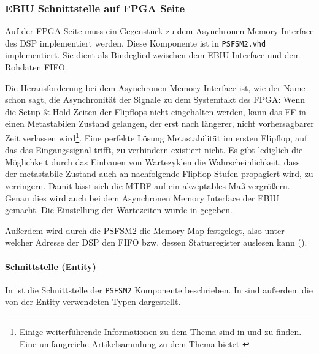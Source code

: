 \subsubsection{EBIU Schnittstelle auf FPGA Seite}


Auf der FPGA Seite muss ein Gegenstück zu dem Asynchronen Memory Interface des DSP implementiert werden. Diese Komponente ist in \lstinline$PSFSM2.vhd$ implementiert. Sie dient als Bindeglied zwischen dem EBIU Interface und dem Rohdaten FIFO.

Die Herausforderung bei dem Asynchronen Memory Interface ist, wie der Name schon sagt, die Asynchronität der Signale zu dem Systemtakt des FPGA: Wenn die Setup \& Hold Zeiten der Flipflops nicht eingehalten werden, kann das FF in einen Metastabilen Zustand gelangen, der erst nach längerer, nicht vorhersagbarer Zeit verlassen wird\footnote{Einige weiterführende Informationen zu dem Thema sind in \cite{FPGAFAQMetastability} und \cite{ginosar2011metastability} zu finden. Eine umfangreiche Artikelsammlung zu dem Thema bietet \cite{MetastabilityBibliography}}. 
Eine perfekte Lösung Metastabilität im ersten Flipflop, auf das das Eingangssignal trifft, zu verhindern existiert nicht. Es gibt lediglich die Möglichkeit durch das Einbauen von Wartezyklen die Wahrscheinlichkeit, dass der metastabile Zustand auch an nachfolgende Flipflop Stufen propagiert wird, zu verringern. Damit lässt sich die \gls{MTBF} auf ein akzeptables Maß vergrößern. Genau dies wird auch bei dem Asynchronen Memory Interface der EBIU gemacht. Die Einstellung der Wartezeiten wurde in  gegeben.

Außerdem wird durch die PSFSM2 die Memory Map festgelegt, also unter welcher Adresse der DSP den FIFO bzw. dessen Statusregister auslesen kann ().

\paragraph{Schnittstelle (Entity)}
In  ist die Schnittstelle der \lstinline$PSFSM2$ Komponente beschrieben. In  sind außerdem die von der Entity verwendeten Typen dargestellt.

